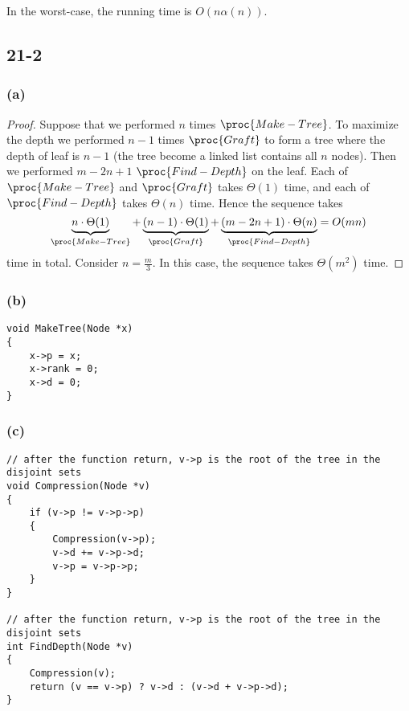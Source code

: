 In the worst-case, the running time is $O(n \alpha(n))$.

\subsection*{21-2}

\subsubsection*{(a)}

\begin{proof}
    Suppose that we performed $n$ times $\proc{Make-Tree}$.
    To maximize the depth we performed $n - 1$ times $\proc{Graft}$
    to form a tree where the depth of leaf is $n - 1$ 
    (the tree become a linked list contains all $n$ nodes).
    Then we performed $m - 2n + 1$ $\proc{Find-Depth}$ on the leaf.
    Each of $\proc{Make-Tree}$ and $\proc{Graft}$ takes $\Theta(1)$ time,
    and each of $\proc{Find-Depth}$ takes $\Theta(n)$ time.
    Hence the sequence takes
    \begin{equation*}
        \underbrace{n \cdot \Theta(1)}_{\proc{Make-Tree}}
        + \underbrace{(n - 1) \cdot \Theta(1)}_{\proc{Graft}}
        + \underbrace{(m - 2n + 1) \cdot \Theta(n)}_{\proc{Find-Depth}}
        = O(mn)
    \end{equation*}
    time in total.
    Consider $n = \frac{m}{3}$.
    In this case, the sequence takes $\Theta(m^2)$ time.
\end{proof}

\subsubsection*{(b)}

\begin{verbatim}
void MakeTree(Node *x)
{
    x->p = x;
    x->rank = 0;
    x->d = 0;
}
\end{verbatim}

\subsubsection*{(c)}

\begin{verbatim}
// after the function return, v->p is the root of the tree in the disjoint sets
void Compression(Node *v)
{
    if (v->p != v->p->p)
    {
        Compression(v->p);
        v->d += v->p->d;
        v->p = v->p->p;
    }
}

// after the function return, v->p is the root of the tree in the disjoint sets
int FindDepth(Node *v)
{
    Compression(v);
    return (v == v->p) ? v->d : (v->d + v->p->d);
}
\end{verbatim}

